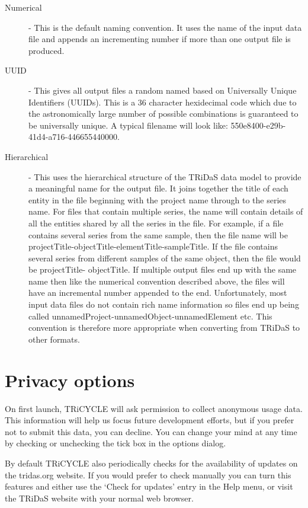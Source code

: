 \documentclass[10pt, headsepline,DIV14,BCOR0.5cm]{scrreprt}
\begin{document}
\begin{description}
 \item[Numerical] - This is the default naming convention. It uses the name of the input data file and
appends an incrementing number if more than one output file is produced.
 \item[UUID] - This gives all output files a random named based on Universally Unique Identifiers
(UUIDs). This is a 36 character hexidecimal code which due to the astronomically
large number of possible combinations is guaranteed to be universally unique. A
typical filename will look like: 550e8400-e29b-41d4-a716-446655440000.
 \item[Hierarchical] - This uses the hierarchical structure of the TRiDaS data model to provide a meaningful
name for the output file. It joins together the title of each entity in the file beginning
with the project name through to the series name. For files that contain multiple series,
the name will contain details of all the entities shared by all the series in the file. For
example, if a file contains several series from the same sample, then the file name
will be projectTitle-objectTitle-elementTitle-sampleTitle. If the file contains several
series from different samples of the same object, then the file would be projectTitle-
objectTitle. If multiple output files end up with the same name then like the numerical
convention described above, the files will have an incremental number appended to
the end. Unfortunately, most input data files do not contain rich name information
so files end up being called unnamedProject-unnamedObject-unnamedElement etc.
This convention is therefore more appropriate when converting from TRiDaS to other
formats.
 \end{description}

\section{Privacy options}

On first launch, TRiCYCLE will ask permission to collect anonymous usage data.  This information will help us focus future development efforts, but if you prefer not to submit this data, you can decline.  You can change your mind at any time by checking or unchecking the tick box in the options dialog.

By default TRiCYCLE also periodically checks for the availability of updates on the tridas.org website.  If you would prefer to check manually you can turn this features and either use the `Check for updates' entry in the Help menu, or visit the TRiDaS website with your normal web browser.
\end{document}
